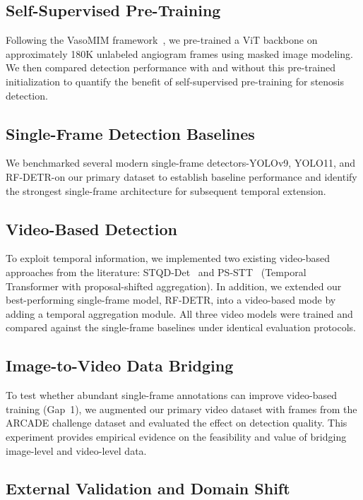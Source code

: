 \documentclass{article}
\begin{document}
\subsection{Self-Supervised Pre-Training}

Following the VasoMIM framework~\cite{huang2026vasomim}, we pre-trained a ViT backbone on approximately 180K unlabeled angiogram frames using masked image modeling. We then compared detection performance with and without this pre-trained initialization to quantify the benefit of self-supervised pre-training for stenosis detection.

\subsection{Single-Frame Detection Baselines}

We benchmarked several modern single-frame detectors-YOLOv9, YOLO11, and RF-DETR-on our primary dataset to establish baseline performance and identify the strongest single-frame architecture for subsequent temporal extension.

\subsection{Video-Based Detection}

To exploit temporal information, we implemented two existing video-based approaches from the literature: STQD-Det~\cite{STQD-Det} and PS-STT~\cite{HAN2023106546} (Temporal Transformer with proposal-shifted aggregation). In addition, we extended our best-performing single-frame model, RF-DETR, into a video-based mode by adding a temporal aggregation module. All three video models were trained and compared against the single-frame baselines under identical evaluation protocols.

\subsection{Image-to-Video Data Bridging}

To test whether abundant single-frame annotations can improve video-based training (Gap~1), we augmented our primary video dataset with frames from the ARCADE challenge dataset and evaluated the effect on detection quality. This experiment provides empirical evidence on the feasibility and value of bridging image-level and video-level data.

\subsection{External Validation and Domain Shift}
\end{document}
